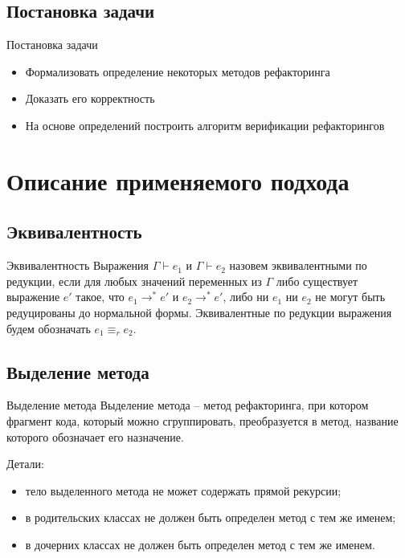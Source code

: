 \documentclass[hyperref=unicode,graphics=pdflatex,13pt]{beamer}
\begin{document}
\subsection{Постановка задачи}
\begin{frame}{Постановка задачи}
\begin{itemize}
    \item Формализовать определение некоторых методов рефакторинга
    \item Доказать его корректность
    \item На основе определений построить алгоритм верификации рефакторингов
\end{itemize}
\end{frame}

\section{Описание применяемого подхода}

\subsection{Эквивалентность}
\begin{frame}{Эквивалентность}
Выражения $\Gamma \vdash e_1$ и $\Gamma \vdash e_2$ назовем эквивалентными по редукции,
если для любых значений переменных из $\Gamma$ либо существует выражение $e'$ такое, что $e_1 \rightarrow^* e'$ и $e_2 \rightarrow^* e'$,
либо ни $e_1$ ни $e_2$ не могут быть редуцированы до нормальной формы.
Эквивалентные по редукции выражения будем обозначать $e_1 \equiv_r e_2$.
\end{frame}

\subsection{Выделение метода}
\begin{frame}{Выделение метода}
Выделение метода -- метод рефакторинга, при котором фрагмент кода, который можно сгруппировать, преобразуется в метод, название которого обозначает его назначение.

Детали:
\begin{itemize}
    \item тело выделенного метода не может содержать прямой рекурсии;
    \item в родительских классах не должен быть определен метод с тем же именем;
    \item в дочерних классах не должен быть определен метод с тем же именем.
\end{itemize}
\end{frame}
\end{document}
